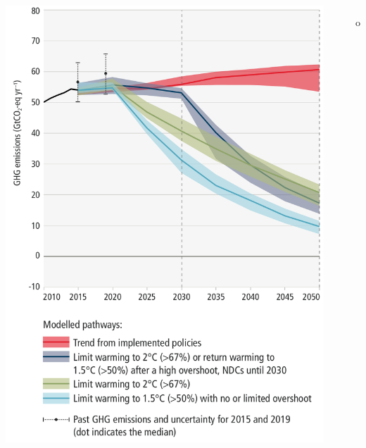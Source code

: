 \begin{frame}
  \begin{scriptsize}

    \vspace{-0.1cm}
    \begin{columns}
      \begin{center}
          \includegraphics[width=1.0\textwidth]{plots/WG3_global_GHG_emissions.png}
      \end{center}  
      
      \begin{itemize}\setlength\itemsep{1.9ex}        
        \item[o] 
      \end{itemize}

    \end{columns}

  \end{scriptsize}
  \end{frame}  

